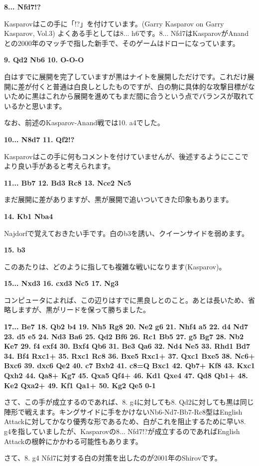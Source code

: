 {\bf 8... Nfd7!?}

Kasparovはこの手に「!?」を付けています。(Garry Kasparov on Garry Kasparov, Vol.3) よくある手としては8... h6です。8... Nfd7はKasparovがAnandとの2000年のマッチで指した新手で、そのゲームはドローになっています。

{\bf 9. Qd2 Nb6 10. O-O-O}

白はすでに展開を完了していますが黒はナイトを展開しただけです。これだけ展開に差が付くと普通は白良しとしたものですが、白の駒に具体的な攻撃目標がないために黒はこれから展開を進めてもまだ間に合うという点でバランスが取れているかと思います。

なお、前述のKasparov-Anand戦では10. a4でした。

{\bf 10... N8d7 11. Qf2!?}

Kasparovはこの手に何もコメントを付けていませんが、後述するようにここでより良い手があると考えられます。

{\bf 11... Bb7 12. Bd3 Rc8 13. Nce2 Nc5}

まだ展開に差がありますが、黒が展開で追いついてきた印象もあります。

{\bf 14. Kb1 Nba4}

Najdorfで覚えておきたい手です。白のb3を誘い、クイーンサイドを弱めます。

{\bf 15. b3}

このあたりは、どのように指しても複雑な戦いになります(Kasparov)。

{\bf 15... Nxd3 16. cxd3 Nc5 17. Ng3}

コンピュータによれば、この辺りはすでに黒良しとのこと。あとは長いため、省略しますが、黒がリードを保って勝ちました。

{\bf 17... Be7 18. Qb2 b4 19. Nh5 Rg8 20. Ne2 g6 21. Nhf4 a5 22. d4 Nd7 23. d5 e5 24. Nd3 Ba6 25. Qd2 Bf6 26. Rc1 Bb5 27. g5 Bg7 28. Nb2 Ke7 29. f4 exf4 30. Bxf4 Qb6 31. Be3 Qa6 32. Nd4 Ne5 33. Rhd1 Bd7 34. Bf4 Rxc1+ 35. Rxc1 Rc8 36. Bxe5 Rxc1+ 37. Qxc1 Bxe5 38. Nc6+ Bxc6 39. dxc6 Qe2 40. c7 Bxb2
41. c8=Q Bxc1 42. Qb7+ Kf8 43. Kxc1 Qxh2 44. Qa8+ Kg7 45. Qxa5 Qf4+ 46. Kd1 Qxe4 47. Qd8 Qb1+ 48. Ke2 Qxa2+ 49. Kf1 Qa1+ 50. Kg2 Qe5 0-1}

さて、この手が成立するのであれば、8. g4に対しても8. Qd2に対しても黒は同じ陣形で戦えます。キングサイドに手をかけないNb6-Nd7-Bb7-Rc8型はEnglish Attackに対してかなり優秀な形であるため、白がこれを阻止するために早い8. g4を指していましたが、Kasparovの8... Nfd7!?が成立するのであればEnglish Attackの根幹にかかわる可能性もあります。

さて、8. g4 Nfd7に対する白の対策を出したのが2001年のShirovです。

